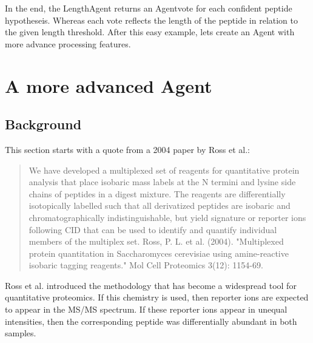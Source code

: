 \npar In the end, the LengthAgent returns an Agentvote for each confident peptide hypotheseis. Whereas each vote reflects the length of the peptide in relation to the given length threshold.
\npar After this easy example, lets create an Agent with more advance processing features.

\section{A more advanced Agent}

\subsection{Background}
This section starts with a quote from a 2004 paper by Ross et al.:
\begin{quote}
\textsf{We have developed a multiplexed set of reagents for quantitative protein analysis that place isobaric mass labels at the N termini and lysine side chains of peptides in a digest mixture. The reagents are differentially isotopically labelled such that all derivatized peptides are isobaric and chromatographically indistinguishable, but yield signature or reporter ions following CID that can be used to identify and quantify individual members of the multiplex set.}
\newline
\footnotesize Ross, P. L. et al. (2004). "Multiplexed protein quantitation in Saccharomyces cerevisiae using amine-reactive isobaric tagging reagents." Mol Cell Proteomics 3(12): 1154-69.
 \end{quote}
 \npar Ross et al. introduced the \ITRAQ methodology that has become a widespread tool for quantitative proteomics. If this chemistry is used, then \ITRAQ reporter ions are expected to appear in the MS/MS spectrum. If these reporter ions appear in unequal intensities, then the corresponding peptide was differentially abundant in both samples.
